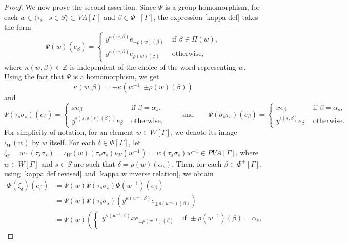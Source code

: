 \documentclass[12pt]{amsart}
\numberwithin{equation}{section}
\begin{document}
\begin{proof}
We now prove the second assertion. Since $\Psi$ is a group homomorphism, for each $w\in \langle \tau_s \mid s\in S \rangle\subset VA[\Gamma]$ and $\beta \in \Phi^{+}[\Gamma]$, the expression \eqref{kappa def} takes the form
\begin{equation}\label{kappa def revised}
\Psi(w)(e_\beta)=\begin{cases} y^{\kappa(w, \beta)} e_{-\rho(w)(\beta)}  & \text{ if } \beta\in \Pi(w), \\ 
y^{\kappa(w, \beta)} e_{\rho(w)(\beta)} & \text{ otherwise},\end{cases}
\end{equation}
where $\kappa(w, \beta) \in \mathbb Z$ is independent of the choice of the word representing $w$. Using the fact that $\Psi$ is a homomorphism, we get
\begin{equation}\label{kappa w inverse relation}
\kappa(w, \beta) = - \kappa(w^{-1}, \pm \rho(w)(\beta))
\end{equation} 
and
$$\Psi(\tau_s\sigma_s)(e_\beta)=\begin{cases}
xe_\beta & \text{ if } \beta=\alpha_s,\\
y^{\epsilon(s, \rho(s)(\beta))}e_\beta & \text{ otherwise, }
\end{cases} \quad \quad \text{and} \quad \quad \Psi(\sigma_s\tau_s)(e_\beta)=\begin{cases}
xe_\beta & \text{ if } \beta=\alpha_s,\\
y^{\epsilon(s, \beta)}e_\beta & \text{ otherwise. }
\end{cases}
$$
For simplicity of notation, for an element $w \in W[\Gamma]$, we denote its image $\iota_W(w)$ by $w$ itself. For each $\delta\in\Phi[\Gamma]$, let $\zeta_\delta=w\cdot(\tau_s\sigma_s)=\iota_W(w) (\tau_s\sigma_s)\iota_W(w^{-1})= w (\tau_s\sigma_s) w^{-1}\in PVA[\Gamma]$, where  $w\in W[\Gamma]$ and $s\in S$ are such that $\delta=\rho(w)(\alpha_s)$. Then, for each $\beta \in \Phi^{+}[\Gamma]$, using \eqref{kappa def revised} and \eqref{kappa w inverse relation}, we obtain
\begin{align*}
\Psi(\zeta_\delta)(e_\beta)
&= \Psi(w)\Psi(\tau_s\sigma_s) \Psi(w^{-1})(e_\beta) \\
&= \Psi(w)\Psi(\tau_s\sigma_s)(y^{\kappa(w^{-1},\beta)}e_{\pm \rho(w^{-1})(\beta)})\\
&=\Psi(w)\left(\begin{cases} 
y^{\kappa(w^{-1},\beta)} x e_{\pm \rho(w^{-1})(\beta)} & \text{ if } \pm \rho(w^{-1})(\beta)=\alpha_s,\\

\end{cases}
\end{align*}
\end{proof}
\end{document}
